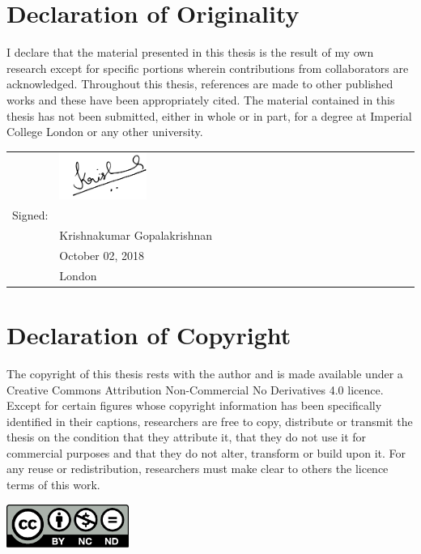 
\chapter*{Declaration of Originality \hfill}

\vspace*{-1.0cm}

I declare  that the material presented  in this thesis  is the result of  my own
research except  for specific portions wherein  contributions from collaborators
are acknowledged. Throughout this thesis, references are made to other published
works and  these have been appropriately  cited. The material contained  in this
thesis has  not been  submitted, either  in whole or  in part,  for a  degree at
Imperial College London or any other university.\\[-3em]

\begin{flushright}
        \begin{tabular}{@{}p{.4in}p{2.1in}@{}}
            & \includegraphics[angle=-5,width=0.25\textwidth]{black_ink_sign_from_jpg}\\[-2em]
            Signed: & \hrulefill \\
                    & Krishnakumar Gopalakrishnan \\
                    & October 02, 2018\\
                    & London \\
        \end{tabular}
\end{flushright}

{\let\clearpage\relax \chapter*{Declaration of Copyright\hfill}}

\vspace*{-1cm}

\noindent  The copyright  of  this thesis  rests  with the  author  and is  made
available under a Creative Commons Attribution Non-Commercial No Derivatives 4.0
licence.  Except  for  certain  figures whose  copyright  information  has  been
specifically  identified  in  their  captions, researchers  are  free  to  copy,
distribute or transmit the thesis on  the condition that they attribute it, that
they do not use it for commercial purposes and that they do not alter, transform
or build upon  it. For any reuse or redistribution,  researchers must make clear
to others the licence terms of this work.

\raggedright
\includegraphics[width=0.3\textwidth]{chapters/backmatter/doclicense-CC-by-nc-nd.pdf}


\vfill

